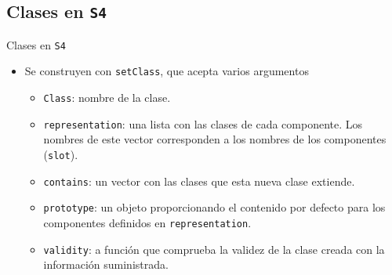 \documentclass[xcolor={usenames,svgnames,dvipsnames}]{beamer}
\begin{document}
\subsection{Clases en \texttt{S4}}
\label{sec:orgheadline31}
\begin{frame}[fragile,label={sec:orgheadline21}]{Clases en \texttt{S4}}
 \begin{itemize}
\item Se construyen con \texttt{setClass}, que acepta varios argumentos
\begin{itemize}
\item \texttt{Class}: nombre de la clase.
\item \texttt{representation}: una lista con las clases de cada componente. Los nombres de este vector corresponden a los nombres de los componentes (\texttt{slot}).
\item \texttt{contains}: un vector con las clases que esta nueva clase extiende.
\item \texttt{prototype}: un objeto proporcionando el contenido por defecto para los componentes definidos en \texttt{representation}.
\item \texttt{validity}: a función que comprueba la validez de la clase creada con la información suministrada.
\end{itemize}
\end{itemize}
\end{frame}
\end{document}
